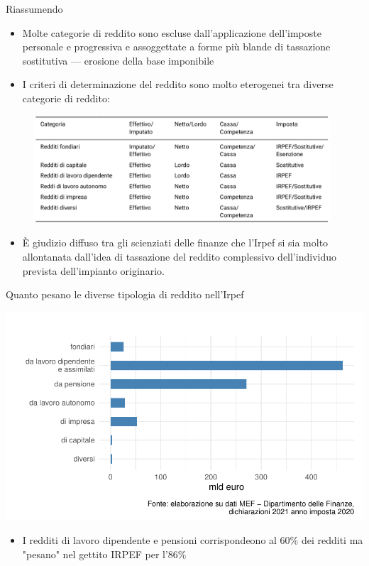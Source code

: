 \documentclass[11pt]{beamer}
\newcommand\€{\,\text{€}}
\begin{document}
\begin{frame}{Riassumendo}
\begin{itemize}
\item Molte categorie di reddito sono escluse dall'applicazione dell'imposte
personale e progressiva e assoggettate a forme più blande di tassazione
sostitutiva --- \alert{erosione} della base imponibile
\item I criteri di determinazione del reddito sono molto eterogenei tra diverse
categorie di reddito:
\end{itemize}

\begin{figure}
\centering
\includegraphics[height=4cm]{./figure/categorie-di-reddito-Irpef.png}
\end{figure}


\begin{itemize}
\item È giudizio diffuso tra gli scienziati delle finanze che l'Irpef si sia molto
allontanata dall'idea di tassazione del reddito \alert{complessivo} dell'individuo
prevista dell'impianto originario.
\end{itemize}
\end{frame}

\begin{frame}{Quanto pesano le diverse tipologia di reddito nell'Irpef}
\begin{center}
\includegraphics[width=\textwidth]{./figure/redditi-dichiarati-per-tipologia-2020-color.pdf}
\end{center}

\begin{itemize}
\item I redditi di lavoro dipendente e pensioni corrispondeono al 60\% dei redditi
ma "pesano" nel gettito IRPEF per l'86\%
\end{itemize}
\end{frame}
\end{document}
